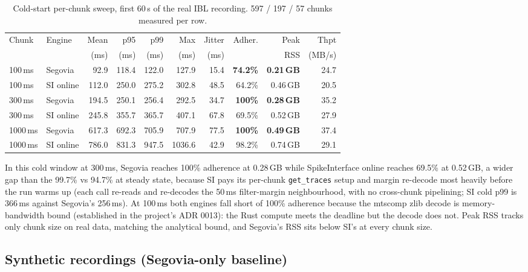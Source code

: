 \documentclass[11pt]{article}
\begin{document}
\begin{table}[h]
\centering
\small
\caption{Cold-start per-chunk sweep, first 60\,s of the real IBL recording.
597 / 197 / 57 chunks measured per row.}
\label{tab:cold}
\begin{tabular}{llrrrrrrrr}
\toprule
Chunk & Engine & Mean & p95 & p99 & Max & Jitter & Adher. & Peak & Thpt \\
 & & (ms) & (ms) & (ms) & (ms) & (ms) & & RSS & (MB/s) \\
\midrule
100\,ms & Segovia & 92.9 & 118.4 & 122.0 & 127.9 & 15.4 & \textbf{74.2\%} & \textbf{0.21\,GB} & 24.7 \\
100\,ms & SI online & 112.0 & 250.0 & 275.2 & 302.8 & 48.5 & 64.2\% & 0.46\,GB & 20.5 \\
300\,ms & Segovia & 194.5 & 250.1 & 256.4 & 292.5 & 34.7 & \textbf{100\%} & \textbf{0.28\,GB} & 35.2 \\
300\,ms & SI online & 245.8 & 355.7 & 365.7 & 407.1 & 67.8 & 69.5\% & 0.52\,GB & 27.9 \\
1000\,ms & Segovia & 617.3 & 692.3 & 705.9 & 707.9 & 77.5 & \textbf{100\%} & \textbf{0.49\,GB} & 37.4 \\
1000\,ms & SI online & 786.0 & 831.3 & 947.5 & 1036.6 & 42.9 & 98.2\% & 0.74\,GB & 29.1 \\
\bottomrule
\end{tabular}
\end{table}

In this cold window at 300\,ms, Segovia reaches 100\% adherence at 0.28\,GB while SpikeInterface online
reaches 69.5\% at 0.52\,GB, a wider gap than the 99.7\% vs 94.7\% at steady state, because SI pays its
per-chunk \texttt{get\_traces} setup and margin re-decode most heavily before the run warms up (each
call re-reads and re-decodes the 50\,ms filter-margin neighbourhood, with no cross-chunk pipelining;
SI cold p99 is 366\,ms against Segovia's 256\,ms). At 100\,ms both engines fall short of 100\%
adherence because the mtscomp zlib decode is memory-bandwidth bound (established in the project's ADR
0013): the Rust compute meets the deadline but the decode does not. Peak RSS tracks only chunk size on
real data, matching the analytical bound, and Segovia's RSS sits below SI's at every chunk size.

\subsection{Synthetic recordings (Segovia-only baseline)}
\label{sec:synth}
\end{document}
